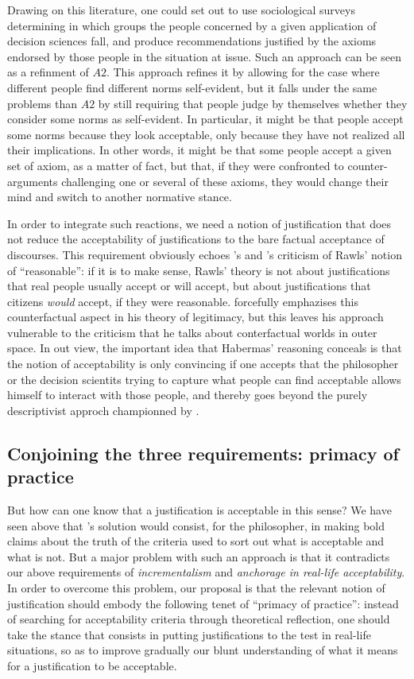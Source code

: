 \documentclass[preprint, french, english, 11pt, authoryear]{elsarticle}%
\begin{document}
Drawing on this literature, one could set out to use sociological surveys determining in which groups the people concerned by a given application of decision sciences fall, and produce recommendations justified by the axioms endorsed by those people in the situation at issue. Such an approach can be seen as a refinment of $A2$. This approach refines it by allowing for the case where different people find different norms self-evident, but it falls under the same problems than $A2$ by still requiring that people judge by themselves whether they consider some norms as self-evident. In particular, it might be that people accept some norms because they look acceptable, only because they have not realized all their implications.  In other words, it might be that some people accept a given set of axiom, as a matter of fact, but that, if they were confronted to counter-arguments challenging one or several of these axioms, they would change their mind and switch to another normative stance.

In order to integrate such reactions, we need a notion of justification that does not reduce the acceptability of justifications to the bare factual acceptance of discourses. This requirement obviously echoes \cite{habermas_reconciliation_1995}'s and \cite{estlund_democratic_2009}'s criticism of Rawls' notion of “reasonable”: if it is to make sense, Rawls' theory is not about justifications that real people usually accept or will accept, but about justifications that citizens \emph{would} accept, if they were reasonable. \citet{habermas_faktizitat_1992} forcefully emphazises this counterfactual aspect in his theory of legitimacy, but this leaves his approach vulnerable to the criticism that he talks about conterfactual worlds in outer space. In out view, the important idea that Habermas' reasoning conceals is that the notion of acceptability is only convincing if one accepts that the philosopher or the decision scientits trying to capture what people can find acceptable allows himself to interact with those people, and thereby goes beyond the purely descriptivist approch championned by \citep{boltanski_justification_2006}.

\subsection{Conjoining the three requirements: primacy of practice}
But how can one know that a justification is acceptable in this sense? We have seen above that \cite{estlund_democratic_2009}'s solution would consist, for the philosopher, in making bold claims about the truth of the criteria used to sort out what is acceptable and what is not. But a major problem with such an approach is that it contradicts our above requirements of \emph{incrementalism} and \emph{anchorage in real-life acceptability}. In order to overcome this problem, our proposal is that the relevant notion of justification should embody the following tenet of “primacy of practice”: instead of searching for acceptability criteria through theoretical reflection, one should take the stance that consists in putting justifications to the test in real-life situations, so as to improve gradually our blunt understanding of what it means for a justification to be acceptable.
\end{document}
